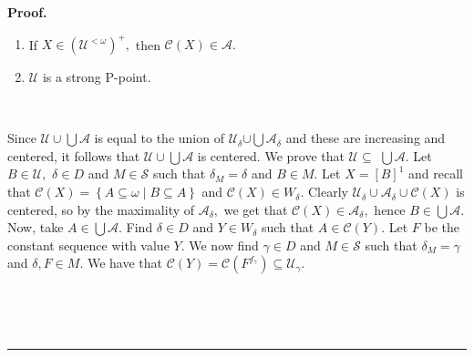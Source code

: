 \documentclass[10pt,a4paper]{amsart}
\newenvironment{proof}[1][Proof]{\noindent\textbf{#1.} }{\ \rule{0.5em}{0.5em}}
\begin{document}
\begin{proof}
\begin{claim}
\begin{enumerate}
\item If $X\in\left(  \mathcal{U}^{<\omega}\right)  ^{+},$ then $\mathcal{C}%
\left(  X\right)  \in\mathcal{A}.$

\item $\mathcal{U}$ is a strong \textsf{P}-point.
\end{enumerate}
\end{claim}

\qquad\qquad\ \ \ \ 

Since $\mathcal{U\cup}%
{\textstyle\bigcup}
\mathcal{A}$ is equal to the union of $\mathcal{U}_{\delta}\mathcal{\cup}%
{\textstyle\bigcup}
\mathcal{A}_{\delta}$ and these are increasing and centered, it follows that
$\mathcal{U\cup}%
{\textstyle\bigcup}
\mathcal{A}$ is centered. We prove that $\mathcal{U\subseteq}$ $%
{\textstyle\bigcup}
\mathcal{A}.$ Let $B\in\mathcal{U},$ $\delta\in D$ and $M\in\mathcal{S}$ such
that $\delta_{M}=\delta$ and $B\in M.$ Let $X=\left[  B\right]  ^{1}$ and
recall that $\mathcal{C}\left(  X\right)  =\left\{  A\subseteq\omega\mid
B\subseteq A\right\}  $ and $\mathcal{C}\left(  X\right)  \in W_{\delta}$.
Clearly $\mathcal{U}_{\delta}\cup\mathcal{A}_{\delta}\cup\mathcal{C}\left(
X\right)  $ is centered, so by the maximality of $\mathcal{A}_{\delta},$ we
get that $\mathcal{C}\left(  X\right)  \in\mathcal{A}_{\delta},$ hence $B\in%
{\textstyle\bigcup}
\mathcal{A}.$ Now, take $A\in%
{\textstyle\bigcup}
\mathcal{A}.$ Find $\delta\in D$ and $Y\in W_{\delta}$ such that
$A\in\mathcal{C}\left(  Y\right)  .$ Let $F$ be the constant sequence with
value $Y.$ We now find $\gamma\in D$ and $M\in\mathcal{S}$ such that
$\delta_{M}=\gamma$ and $\delta,F\in M.$ We have that $\mathcal{C}\left(
Y\right)  =\mathcal{C}\left(  F^{f_{\gamma}}\right)  \subseteq\mathcal{U}%
_{\gamma}.$

\qquad\qquad\ \ \qquad\ \ \ 


\end{proof}
\end{document}
